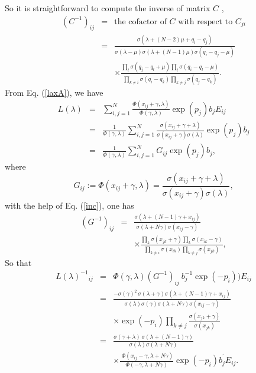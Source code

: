 \documentclass[a4paper,12pt]{article}
\begin{document}
\vspace{0.2cm} So it is straightforward to compute the inverse of matrix $C$
,
\begin{eqnarray}
(C^{-1})_{ij} &=&\mbox{the cofactor of }C\mbox{ with respect
to }C_{ji}
\nonumber \\
&=&\frac{\sigma (\lambda +(N-2)\mu +q_{i}-q_{j})}{\sigma
(\lambda -\mu )\sigma (\lambda +(N-1)\mu )\sigma
(q_{i}-q_{j}-\mu )}  \nonumber \\ &&\times
\frac{\prod_{l}\sigma (q_{j}-q_{l}+\mu )\prod_{l}\sigma
(q_{i}-q_{l}-\mu )}{\prod_{k\neq i}\sigma
(q_{i}-q_{k})\prod_{k\neq j}\sigma (q_{j}-q_{k})}.
\label{inc}
\end{eqnarray}
From Eq. (\ref{laxA}), we have
\begin{eqnarray}
L(\lambda ) &=&\sum_{i,j=1}^{N}\frac{\Phi
(x_{ij}+\gamma ,\lambda )}{
\Phi (\gamma ,\lambda )}\mathrm{\exp }(p_{j})b_{j}E_{ij}  \nonumber \\
&=&\frac{1}{\Phi (\gamma ,\lambda
)}\sum_{i,j=1}^{N}\frac{\sigma (x_{ij}+\gamma +\lambda
)}{\sigma (x_{ij}+\gamma )\sigma (\lambda )}\mathrm{
\exp }(p_{j})b_{j}  \nonumber \\
&=&\frac{1}{\Phi (\gamma ,\lambda
)}\sum_{i,j=1}^{N}G_{ij}\mathrm{\exp } (p_{j})b_{j},
\end{eqnarray}
where
\[
G_{ij}:=\Phi (x_{ij}+\gamma ,\lambda )=\frac{\sigma
(x_{ij}+\gamma +\lambda )}{\sigma (x_{ij}+\gamma )\sigma
(\lambda )},
\]
with the help of Eq. (\ref{inc}), one has
\begin{eqnarray}
(G^{-1})_{ij} &=&\frac{\sigma (\lambda +(N-1)\gamma
+x_{ij})}{\sigma (\lambda +N\gamma )\sigma (x_{ij}-\gamma )}
\nonumber \\ &&\times \frac{\prod_{k}\sigma (x_{jk}+\gamma
)\prod_{k}\sigma (x_{ik}-\gamma )}{\prod_{k\neq i}\sigma
(x_{ik})\prod_{k\neq j}\sigma (x_{jk})},
\end{eqnarray}
So that
\begin{eqnarray}
L(\lambda )^{-1}{}_{ij} &=&\Phi (\gamma ,\lambda
)(G^{-1})_{ij}\ b_{j}^{-1}
\mathrm{\exp }(-p_{i}))E_{ij}  \nonumber \\
&=&\frac{-\sigma (\gamma )^{2}\,\sigma (\lambda +\gamma
)\sigma (\lambda +(N-1)\gamma +x_{ij})}{\sigma (\lambda
)\sigma (\gamma )\sigma (\lambda +N\gamma )\sigma
(x_{ij}-\gamma )}  \nonumber \\ &&\times \mathrm{\exp
}(-p_{i})\prod_{k\neq j}\frac{\sigma (x_{jk}+\gamma )}{
\sigma (x_{jk})}  \nonumber \\
&=&\frac{\sigma (\gamma +\lambda )\,\sigma (\lambda
+(N-1)\gamma )}{\sigma (\lambda )\sigma (\lambda +N\gamma )}
\nonumber \\ &&\times \frac{\;\Phi (x_{ij}-\gamma
,\lambda +N\gamma )}{\Phi (-\gamma ,\lambda +N\gamma
)}\mathrm{\exp }(-p_{i})b_{j}^{^{\prime }}E_{ij}.
\end{eqnarray}
\end{document}
